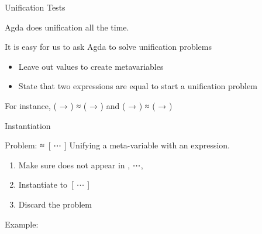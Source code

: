 \documentclass[compress,9pt]{beamer}
\begin{document}
\begin{frame}{Unification Tests}
  \begin{minipage}{0.75\textwidth}
  Agda does unification all the time.\medskip

  It is easy for us to ask Agda to solve unification problems

  \begin{itemize}
    \item Leave out values to create metavariables
    \item State that two expressions are equal to start a unification problem
  \end{itemize}
  \end{minipage}
  \begin{minipage}{0.15\textwidth}
  \end{minipage}

  \bigskip
  For instance, {( → ) ≈ ( → )} and
  {( → ) ≈ ( → )}

  \begin{minipage}{0.35\textwidth}
  \end{minipage}\begin{minipage}{0.55\textwidth}
  \end{minipage}
\end{frame}

\begin{frame}{Instantiation}
  \begin{alertblock}{Problem: { ≈ \,[ ⋯ ]}}
    Unifying a meta-variable with an expression.
  \end{alertblock}

  \bigskip
  \begin{enumerate}
    \item Make sure  does not appear in , ⋯, 
    \item Instantiate  to {\,[ ⋯ ]}
    \item Discard the problem
  \end{enumerate}

  \bigskip Example:
\end{frame}
\end{document}
